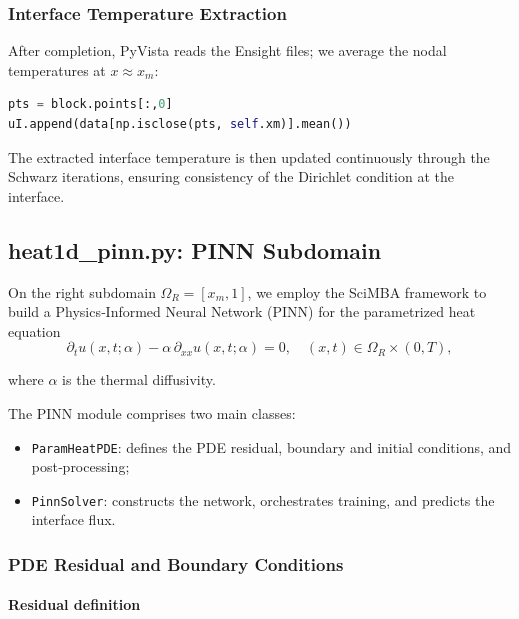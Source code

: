\documentclass[12pt]{article}
\begin{document}
\subsubsection{Interface Temperature Extraction}

After completion, PyVista reads the Ensight files; we average the nodal temperatures at \(x\approx x_m\):
\begin{lstlisting}[language=Python]
pts = block.points[:,0]
uI.append(data[np.isclose(pts, self.xm)].mean())
\end{lstlisting}

The extracted interface temperature is then updated continuously through the Schwarz iterations, ensuring consistency of the Dirichlet condition at the interface.

\subsection{heat1d\_pinn.py: PINN Subdomain}

On the right subdomain \(\Omega_R=[x_m,1]\), we employ the SciMBA framework to build a Physics‐Informed Neural Network (PINN)\cite{raissi_physics-informed_2019} for the parametrized heat equation
\begin{equation}
    \partial_t u(x,t;\alpha)
    - \alpha\,\partial_{xx}u(x,t;\alpha)=0,
    \quad (x,t)\in\Omega_R\times(0,T),
\end{equation}

where \(\alpha\) is the thermal diffusivity.

The PINN module comprises two main classes:
\begin{itemize}
  \item \texttt{ParamHeatPDE}: defines the PDE residual, boundary and initial conditions, and post‐processing;
  \item \texttt{PinnSolver}: constructs the network, orchestrates training, and predicts the interface flux.
\end{itemize}

\subsubsection{PDE Residual and Boundary Conditions}

\paragraph{Residual definition}\mbox{}\\
\end{document}
